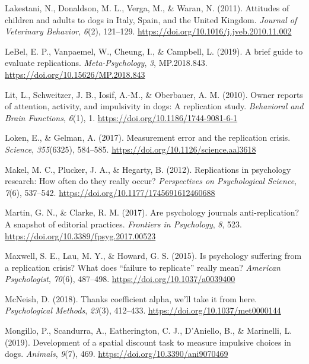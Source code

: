 \documentclass[
  pub,floatsintext]{apa6}
\newlength{\cslhangindent}
\newlength{\cslentryspacingunit} %
\newenvironment{CSLReferences}[2] %
 {%
  \setlength{\parindent}{0pt}
  \ifodd #1
  \let\oldpar\par
  \def\par{\hangindent=\cslhangindent\oldpar}
  \fi
  \setlength{\parskip}{#2\cslentryspacingunit}
 }%
 {}
\begin{document}
\begin{CSLReferences}{1}{0}
\leavevmode{}%
Lakestani, N., Donaldson, M. L., Verga, M., \& Waran, N. (2011). Attitudes of children and adults to dogs in {Italy}, {Spain}, and the {United Kingdom}. \emph{Journal of Veterinary Behavior}, \emph{6}(2), 121--129. \url{https://doi.org/10.1016/j.jveb.2010.11.002}

\leavevmode{}%
LeBel, E. P., Vanpaemel, W., Cheung, I., \& Campbell, L. (2019). A brief guide to evaluate replications. \emph{Meta-Psychology}, \emph{3}, MP.2018.843. \url{https://doi.org/10.15626/MP.2018.843}

\leavevmode{}%
Lit, L., Schweitzer, J. B., Iosif, A.-M., \& Oberbauer, A. M. (2010). Owner reports of attention, activity, and impulsivity in dogs: A replication study. \emph{Behavioral and Brain Functions}, \emph{6}(1), 1. \url{https://doi.org/10.1186/1744-9081-6-1}

\leavevmode{}%
Loken, E., \& Gelman, A. (2017). Measurement error and the replication crisis. \emph{Science}, \emph{355}(6325), 584--585. \url{https://doi.org/10.1126/science.aal3618}

\leavevmode{}%
Makel, M. C., Plucker, J. A., \& Hegarty, B. (2012). Replications in psychology research: How often do they really occur? \emph{Perspectives on Psychological Science}, \emph{7}(6), 537--542. \url{https://doi.org/10.1177/1745691612460688}

\leavevmode{}%
Martin, G. N., \& Clarke, R. M. (2017). Are psychology journals anti-replication? {A} snapshot of editorial practices. \emph{Frontiers in Psychology}, \emph{8}, 523. \url{https://doi.org/10.3389/fpsyg.2017.00523}

\leavevmode{}%
Maxwell, S. E., Lau, M. Y., \& Howard, G. S. (2015). Is psychology suffering from a replication crisis? {What} does {``failure to replicate''} really mean? \emph{American Psychologist}, \emph{70}(6), 487--498. \url{https://doi.org/10.1037/a0039400}

\leavevmode{}%
McNeish, D. (2018). Thanks coefficient alpha, we'll take it from here. \emph{Psychological Methods}, \emph{23}(3), 412--433. \url{https://doi.org/10.1037/met0000144}

\leavevmode{}%
Mongillo, P., Scandurra, A., Eatherington, C. J., D'Aniello, B., \& Marinelli, L. (2019). Development of a spatial discount task to measure impulsive choices in dogs. \emph{Animals}, \emph{9}(7), 469. \url{https://doi.org/10.3390/ani9070469}


\end{CSLReferences}
\end{document}
